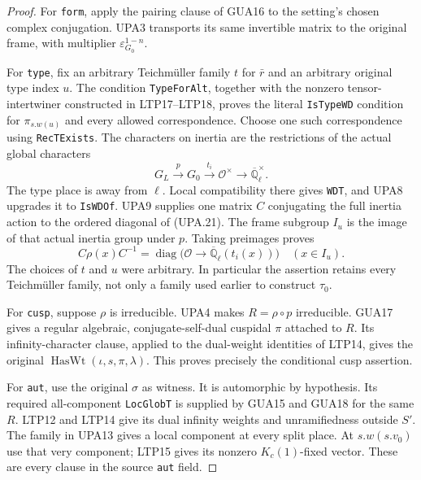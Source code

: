 \documentclass[11pt,a4paper]{article}
\numberwithin{equation}{section}
\theoremstyle{remark}\newtheorem{remark}[theorem]{Remark}
\begin{document}
\begin{proof}
For \texttt{form}, apply the pairing clause of
GUA16 to the setting's chosen complex
conjugation.  UPA3 transports its same invertible matrix
to the original frame, with multiplier
$\varepsilon_{G_0}^{1-n}$.

For \texttt{type}, fix an arbitrary Teichm\"uller family
$t$ for $\bar r$ and an arbitrary original type index $u$.
The condition \texttt{Type\allowbreak For\allowbreak Alt}, together with the
nonzero tensor-intertwiner constructed in
LTP17--LTP18, proves the literal
\texttt{Is\allowbreak Type\allowbreak WD} condition for $\pi_{s.w(u)}$ and
every allowed correspondence.  Choose one such
correspondence using \texttt{Rec\allowbreak TExists}.  The characters
on inertia are the restrictions of the actual global
characters
\[
 G_L\xrightarrow{p}G_0\xrightarrow{t_i}\mathcal O^\times
       \longrightarrow\overline{\mathbb Q}_\ell^\times.
 \tag{UPA.21}
\]
The type place is away from $\ell$.  Local compatibility
there gives \texttt{WDT}, and UPA8 upgrades it to
\texttt{Is\allowbreak WDOf}.  UPA9 supplies one matrix $C$ conjugating
the full inertia action to the ordered diagonal of (UPA.21).
The frame subgroup $I_u$ is the image of that actual
inertia group under $p$.  Taking preimages proves
\[
 C\rho(x)C^{-1}
       =\operatorname{diag}\bigl(\mathcal O\to
                       \overline{\mathbb Q}_\ell(t_i(x))\bigr)
       \quad(x\in I_u).
 \tag{UPA.22}
\]
The choices of $t$ and $u$ were arbitrary.  In particular
the assertion retains every Teichm\"uller family, not
only a family used earlier to construct $\tau_0$.

For \texttt{cusp}, suppose $\rho$ is irreducible.
UPA4 makes $R=\rho\circ p$ irreducible.
GUA17 gives a regular algebraic,
conjugate-self-dual cuspidal $\pi$ attached to $R$.
Its infinity-character clause, applied to the dual-weight
identities of LTP14, gives the original
$\operatorname{HasWt}(\iota,s,\pi,\lambda)$.
This proves precisely the conditional cusp assertion.

For \texttt{aut}, use the original $\sigma$ as witness.
It is automorphic by hypothesis.  Its required
all-component \texttt{Loc\allowbreak Glob\allowbreak T} is supplied by
GUA15 and GUA18 for the same $R$.  LTP12 and LTP14
give its dual infinity weights and unramifiedness
outside $S'$.  The family in UPA13 gives a local component
at every split place.  At $s.w(s.v_0)$ use that very
component; LTP15
gives its nonzero $K_c(1)$-fixed vector.
These are every clause in the source \texttt{aut} field.
\end{proof}
\end{document}
